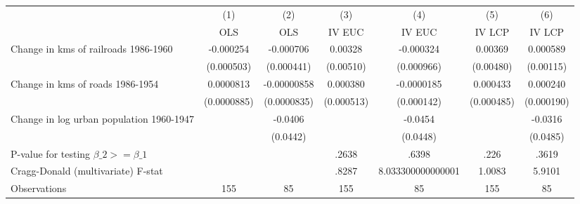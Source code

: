 {
\def\sym#1{\ifmmode^{#1}\else\(^{#1}\)\fi}
\begin{tabular}{l*{6}{c}}
\hline\hline
                &\multicolumn{1}{c}{(1)}&\multicolumn{1}{c}{(2)}&\multicolumn{1}{c}{(3)}&\multicolumn{1}{c}{(4)}&\multicolumn{1}{c}{(5)}&\multicolumn{1}{c}{(6)}\\
                &\multicolumn{1}{c}{OLS}&\multicolumn{1}{c}{OLS}&\multicolumn{1}{c}{IV EUC}&\multicolumn{1}{c}{IV EUC}&\multicolumn{1}{c}{IV LCP}&\multicolumn{1}{c}{IV LCP}\\
\hline
Change in kms of railroads 1986-1960&-0.000254         &-0.000706         &  0.00328         &-0.000324         &  0.00369         & 0.000589         \\
                &(0.000503)         &(0.000441)         &(0.00510)         &(0.000966)         &(0.00480)         &(0.00115)         \\
[1em]
Change in kms of roads 1986-1954&0.0000813         &-0.00000858         & 0.000380         &-0.0000185         & 0.000433         & 0.000240         \\
                &(0.0000885)         &(0.0000835)         &(0.000513)         &(0.000142)         &(0.000485)         &(0.000190)         \\
[1em]
Change in log urban population 1960-1947&                  &  -0.0406         &                  &  -0.0454         &                  &  -0.0316         \\
                &                  & (0.0442)         &                  & (0.0448)         &                  & (0.0485)         \\
\hline
P-value for testing $\beta\_{2} >= \beta\_{1}$&                  &                  &    .2638         &    .6398         &     .226         &    .3619         \\
Cragg-Donald (multivariate) F-stat&                  &                  &    .8287         &8.033300000000001         &   1.0083         &   5.9101         \\
Observations    &      155         &       85         &      155         &       85         &      155         &       85         \\
\hline\hline
\end{tabular}
}
